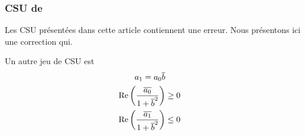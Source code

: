     \subsubsection{CSU de \cite{stupfel_implementation_2015}}

      Les CSU présentées dans cette article contiennent une erreur. Nous présentons ici une correction qui.

      \begin{prop}
        Un autre jeu de CSU est
        \begin{align}
          a_1 = a_0 {\overline{b}} \\
          \operatorname{Re}\left(\dfrac{{\overline{a_0}}}{1 + {\overline{b}}^2}\right) &\ge 0 \\
          \operatorname{Re}\left(\dfrac{{\overline{a_1}}}{1 + {\overline{b}}^2}\right) &\le 0
        \end{align}
      \end{prop}

